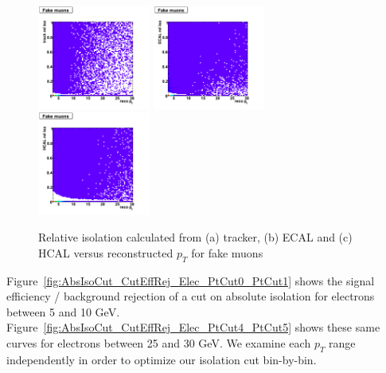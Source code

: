  \begin{figure}[htbp]
    \includegraphics[width = 0.33\textwidth]{pictures/recoPt_relIso/trackIso_muon_fake.png}
    \includegraphics[width = 0.33\textwidth]{pictures/recoPt_relIso/ecalIso_muon_fake.png}
    \includegraphics[width = 0.33\textwidth]{pictures/recoPt_relIso/hcalIso_muon_fake.png}
    \caption{Relative isolation calculated from (a) tracker, (b) ECAL and (c) HCAL versus
       reconstructed $p_{T}$ for fake muons}
    \label{fig:FakeMuonRecoPt_RelIso}
 \end{figure}

 \clearpage

 Figure~\ref{fig:AbsIsoCut_CutEffRej_Elec_PtCut0_PtCut1} shows the signal efficiency / background
 rejection of a cut on absolute isolation for electrons between 5 and 10 GeV.
 Figure~\ref{fig:AbsIsoCut_CutEffRej_Elec_PtCut4_PtCut5} shows these same curves for electrons
 between 25 and 30 GeV. We examine each $p_T$ range independently in order to optimize our isolation
 cut bin-by-bin.

